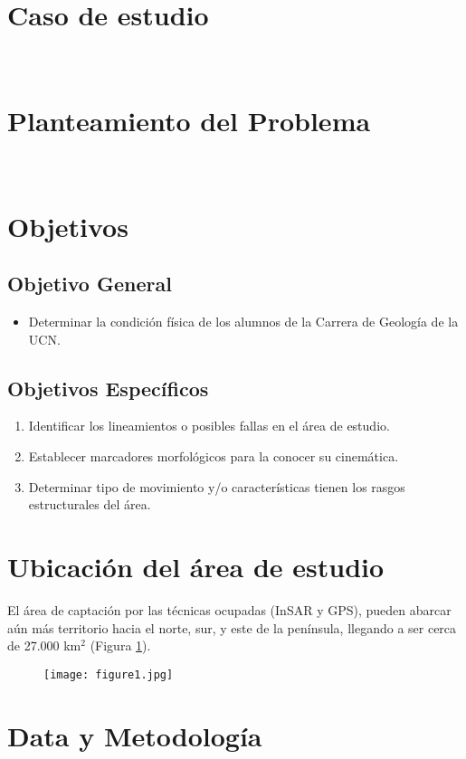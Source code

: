 \fontsize{14}{15}\selectfont
\section{Caso de estudio}
\lipsum[1]\\
\section{Planteamiento del Problema}
\lipsum[1]\\
\section{Objetivos}
\subsection{Objetivo General}
\begin{itemize}
	\item Determinar la condición física de los alumnos de la Carrera de Geología de la UCN.
\end{itemize}
\subsection{Objetivos Específicos}
\begin{enumerate}
	\item Identificar los lineamientos o posibles fallas en el área de estudio. 
	\item Establecer marcadores morfológicos para la conocer su cinemática.
	\item Determinar tipo de movimiento y/o características tienen los rasgos estructurales del área.
\end{enumerate}
\section{Ubicación del área de estudio}
El área de captación por las técnicas ocupadas (InSAR y GPS), pueden abarcar aún más territorio hacia el norte, sur, y este de la península, llegando a ser cerca de 27.000 km$^2$ (Figura \ref{ilustracion1}).\\
\begin{figure}[hb]
	\centering
	\texttt{[image: figure1.jpg]} %
	\captionsetup{labelsep=period, labelfont=bf}
	\caption[Ilustración zorro en desierto]{\blindtext[1]} %
	\label{ilustracion1}
\end{figure}



\section{Data y Metodología}
\lipsum[1]